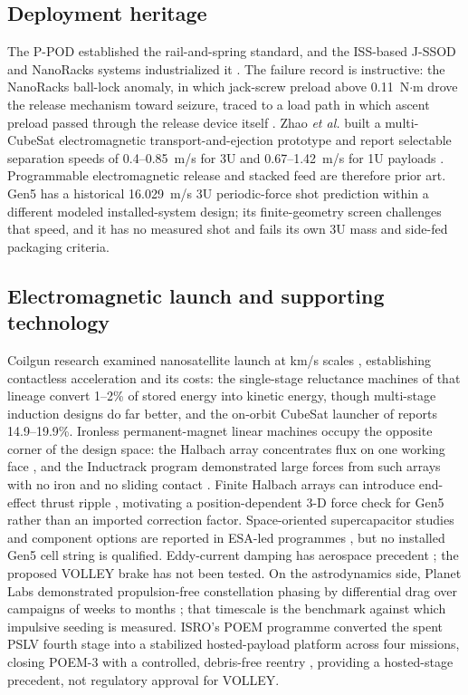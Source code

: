 \documentclass[conference]{IEEEtran}
\begin{document}
\subsection{Deployment heritage}
The P-POD established the rail-and-spring standard, and the ISS-based J-SSOD and NanoRacks systems industrialized it \cite{jssod,soa}. The failure record is instructive: the NanoRacks ball-lock anomaly, in which jack-screw preload above 0.11~N$\cdot$m drove the release mechanism toward seizure, traced to a load path in which ascent preload passed through the release device itself \cite{lewis}. Zhao \emph{et al.} built a multi-CubeSat electromagnetic transport-and-ejection prototype and report selectable separation speeds of 0.4--0.85~m/s for 3U and 0.67--1.42~m/s for 1U payloads \cite{stacked2022}. Programmable electromagnetic release and stacked feed are therefore prior art. Gen5 has a historical 16.029~m/s 3U periodic-force shot prediction within a different modeled installed-system design; its finite-geometry screen challenges that speed, and it has no measured shot and fails its own 3U mass and side-fed packaging criteria.

\subsection{Electromagnetic launch and supporting technology}
Coilgun research examined nanosatellite launch at km/s scales \cite{turman,kaye}, establishing contactless acceleration and its costs: the single-stage reluctance machines of that lineage convert 1--2\% of stored energy into kinetic energy, though multi-stage induction designs do far better, and the on-orbit CubeSat launcher of \cite{feng2025} reports 14.9--19.9\%. Ironless permanent-magnet linear machines occupy the opposite corner of the design space: the Halbach array concentrates flux on one working face \cite{halbach}, and the Inductrack program demonstrated large forces from such arrays with no iron and no sliding contact \cite{inductrack}. Finite Halbach arrays can introduce end-effect thrust ripple \cite{yamaguchi2023}, motivating a position-dependent 3-D force check for Gen5 rather than an imported correction factor. Space-oriented supercapacitor studies and component options are reported in ESA-led programmes \cite{faure,espc}, but no installed Gen5 cell string is qualified. Eddy-current damping has aerospace precedent \cite{eddy}; the proposed VOLLEY brake has not been tested. On the astrodynamics side, Planet Labs demonstrated propulsion-free constellation phasing by differential drag over campaigns of weeks to months \cite{foster,foster2}; that timescale is the benchmark against which impulsive seeding is measured. ISRO's POEM programme converted the spent PSLV fourth stage into a stabilized hosted-payload platform across four missions, closing POEM-3 with a controlled, debris-free reentry \cite{poem3,poem4}, providing a hosted-stage precedent, not regulatory approval for VOLLEY.
\end{document}
